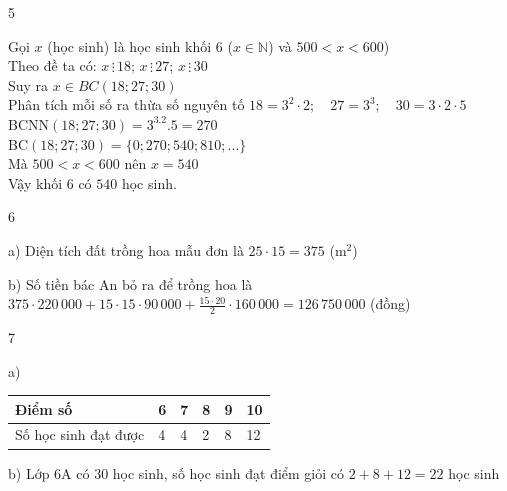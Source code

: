\begin{Solbook}{5}
 \par \noindent Gọi $x$ (học sinh) là học sinh khối 6 ($x\in \mathbb {N}$) và $500 < x < 600$)\\ Theo đề ta có: $x \, \vdots \, 18$; $x\, \vdots \, 27$; $x\, \vdots \, 30$\\ Suy ra $x \in BC(18;27;30)$\\ Phân tích mỗi số ra thừa số nguyên tố $18 = 3^2\cdot 2; \quad 27 = 3^3; \quad 30 = 3\cdot 2\cdot 5$\\ BCNN$(18;27;30)=3^3.2.5=270$\\ BC$(18;27;30)=\{0;270;540;810;...\}$\\ Mà $500 < x < 600$ nên $x=540$\\ Vậy khối 6 có $540$ học sinh. \hfill \qedEX 
\end{Solbook}
\begin{Solbook}{6}
 \par \noindent a) Diện tích đất trồng hoa mẫu đơn là $25\cdot 15=375$ (m$^2$) \\ \par b) Số tiền bác An bỏ ra để trồng hoa là \\ $375\cdot 220\,000 + 15\cdot 15\cdot 90\,000+\frac {15\cdot 20}{2}\cdot 160\,000=126\,750\,000$ (đồng) \hfill \qedEX 
\end{Solbook}
\begin{Solbook}{7}
 \par \noindent  a) \begin {center} \begin {tabular}{|l|l|l|l|l|l|} \hline Điểm số & 6 & 7 & 8 & 9 & 10 \\ \hline Số học sinh đạt được & 4 & 4 & 2 & 8 & 12 \\ \hline \end {tabular} \end {center} b) Lớp 6A có 30 học sinh, số học sinh đạt điểm giỏi có $2+8+12=22$ học sinh \hfill \qedEX 
\end{Solbook}

